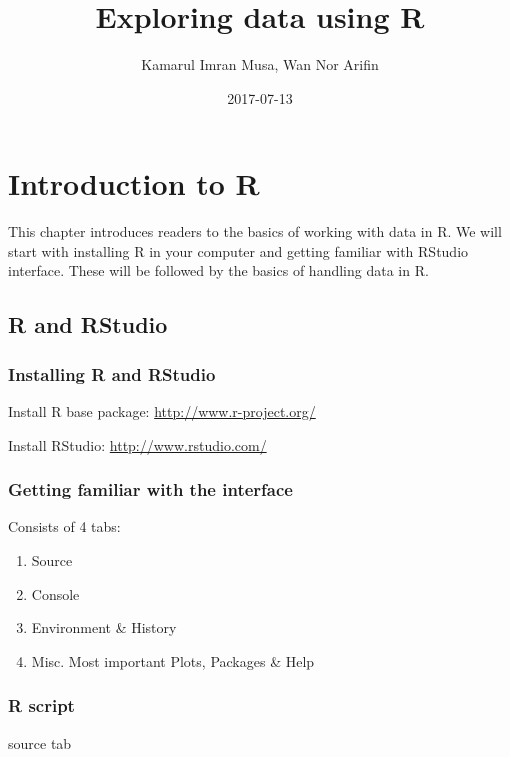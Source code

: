 \documentclass[]{book}
\title{Exploring data using R}
\author{Kamarul Imran Musa, Wan Nor Arifin}
\date{2017-07-13}
\providecommand{\tightlist}{%
  \setlength{\itemsep}{0pt}\setlength{\parskip}{0pt}}
\theoremstyle{definition}
\theoremstyle{definition}
\theoremstyle{remark}
\begin{document}
\maketitle

{
\setcounter{tocdepth}{1}
\tableofcontents
}
\chapter{Introduction to R}\label{introduction-to-r}

This chapter introduces readers to the basics of working with data in R.
We will start with installing R in your computer and getting familiar
with RStudio interface. These will be followed by the basics of handling
data in R.

\section{R and RStudio}\label{r-and-rstudio}

\subsection{Installing R and RStudio}\label{installing-r-and-rstudio}

Install R base package: \url{http://www.r-project.org/}

Install RStudio: \url{http://www.rstudio.com/}

\subsection{Getting familiar with the
interface}\label{getting-familiar-with-the-interface}

Consists of 4 tabs:

\begin{enumerate}
\def\labelenumi{\arabic{enumi}.}
\tightlist
\item
  Source
\item
  Console
\item
  Environment \& History
\item
  Misc. Most important Plots, Packages \& Help 
\end{enumerate}

\subsection{R script}\label{r-script}

source tab
\end{document}
